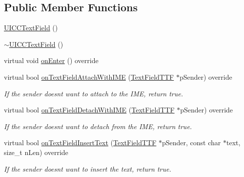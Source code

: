 \subsection*{Public Member Functions}
\begin{DoxyCompactItemize}
\item 
\hyperlink{classui_1_1UICCTextField_a0066110e47fa1a5e5f518bfde6d0ade7}{U\+I\+C\+C\+Text\+Field} ()
\item 
\hyperlink{classui_1_1UICCTextField_a31fb9b3cad0ea7dbb25ddf1599cbd811}{$\sim$\+U\+I\+C\+C\+Text\+Field} ()
\item 
virtual void \hyperlink{classui_1_1UICCTextField_ad74c8dfb537f983d2540af7c5b9cb307}{on\+Enter} () override
\item 
\mbox{\label{classui_1_1UICCTextField_a4d2986206a75486fb195cdf880a569d6}} 
virtual bool \hyperlink{classui_1_1UICCTextField_a4d2986206a75486fb195cdf880a569d6}{on\+Text\+Field\+Attach\+With\+I\+ME} (\hyperlink{classTextFieldTTF}{Text\+Field\+T\+TF} $\ast$p\+Sender) override
\begin{DoxyCompactList}\small\item\em If the sender doesn\textquotesingle{}t want to attach to the I\+ME, return true. \end{DoxyCompactList}\item 
\mbox{\label{classui_1_1UICCTextField_a3c9e73701b4aafb8dc63255ea0555cc5}} 
virtual bool \hyperlink{classui_1_1UICCTextField_a3c9e73701b4aafb8dc63255ea0555cc5}{on\+Text\+Field\+Detach\+With\+I\+ME} (\hyperlink{classTextFieldTTF}{Text\+Field\+T\+TF} $\ast$p\+Sender) override
\begin{DoxyCompactList}\small\item\em If the sender doesn\textquotesingle{}t want to detach from the I\+ME, return true. \end{DoxyCompactList}\item 
\mbox{\label{classui_1_1UICCTextField_a9106f97bfb3bd067b923131f4ca4bec3}} 
virtual bool \hyperlink{classui_1_1UICCTextField_a9106f97bfb3bd067b923131f4ca4bec3}{on\+Text\+Field\+Insert\+Text} (\hyperlink{classTextFieldTTF}{Text\+Field\+T\+TF} $\ast$p\+Sender, const char $\ast$text, size\+\_\+t n\+Len) override
\begin{DoxyCompactList}\small\item\em If the sender doesn\textquotesingle{}t want to insert the text, return true. \end{DoxyCompactList}\item 

\end{DoxyCompactItemize}
